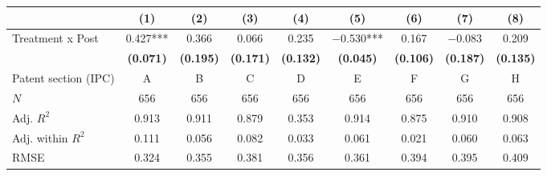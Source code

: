
\begin{tabular}[t]{lcccccccc}
\toprule
  & (1) & (2) & (3) & (4) & (5) & (6) & (7) & (8)\\
\midrule
Treatment x Post & \num{0.427}*** & \num{0.366} & \num{0.066} & \num{0.235} & \num{-0.530}*** & \num{0.167} & \num{-0.083} & \num{0.209}\\
\textbf{} & \textbf{(\num{0.071})} & \textbf{(\num{0.195})} & \textbf{(\num{0.171})} & \textbf{(\num{0.132})} & \textbf{(\num{0.045})} & \textbf{(\num{0.106})} & \textbf{(\num{0.187})} & \textbf{(\num{0.135})}\\
\midrule
Patent section (IPC) & A & B & C & D & E & F & G & H\\
$N$ & \num{656} & \num{656} & \num{656} & \num{656} & \num{656} & \num{656} & \num{656} & \num{656}\\
Adj. $R^2$ & \num{0.913} & \num{0.911} & \num{0.879} & \num{0.353} & \num{0.914} & \num{0.875} & \num{0.910} & \num{0.908}\\
Adj. within $R^2$ & \num{0.111} & \num{0.056} & \num{0.082} & \num{0.033} & \num{0.061} & \num{0.021} & \num{0.060} & \num{0.063}\\
RMSE & \num{0.324} & \num{0.355} & \num{0.381} & \num{0.356} & \num{0.361} & \num{0.394} & \num{0.395} & \num{0.409}\\
\bottomrule
\end{tabular}
